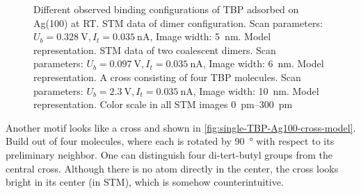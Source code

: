 \begin{figure}[] \centering
	\caption{Different observed binding configurations of TBP adsorbed on Ag(100) at RT.  STM data of dimer configuration. Scan parameters: $U_b=\SI{0.328}{\volt}, I_t=\SI{0.035}{\nano \ampere}$, Image width: \SI{5}{\nm}.  Model representation.  STM data of two coalescent dimers. Scan parameters: $U_b=\SI{0.097}{\volt}, I_t=\SI{0.035}{\nano \ampere}$, Image width: \SI{6}{\nm}.  Model representation.  A cross consisting of four TBP molecules. Scan parameters: $U_b=\SI{2.3}{\volt}, I_t=\SI{0,035}{\nano \ampere}$, Image width: \SI{10}{\nm}.  Model representation. Color scale in all STM images \SIrange{0}{300}{\pico\meter}}
	\label{fig:single-TBP-Ag100-doubledimer}
\end{figure}
Another motif looks like a cross and shown in \autoref{fig:single-TBP-Ag100-cross-model}. Build out of four molecules, where each is rotated by \SI{90}{\degree} with respect to its preliminary neighbor. One can distinguish four di-tert-butyl groups from the central cross. Although there is no atom directly in the center, the cross looks bright in its center (in STM), which is somehow counterintuitive. 

%

